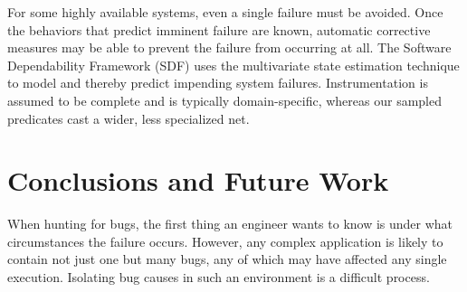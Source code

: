 \documentclass{sig-alternate}
\newcommand{\comment}[1]{}
\begin{document}
\comment{More recent work of interest:

  \begin{itemize}
  \item S.\ Elbaum, S.\ Kanduri and A.\ Andrews, ``Anomalies as
    Precursors of Field Failures, International Symposium of Software
    Reliability Engineering'', IEEE, November 2003.

  \item S.\ Elbaum and M.\ Hardojo, ``An Empirical Study on Profiling
    Strategies for Released Software and Their Application to QA
    Activities'', Technical Report TR03-09-01, University of Nebraska
    - Lincoln, September 2003.
  \end{itemize}

  Cannot find either online, but have written to Elbaum asking him for
  copies.}

For some highly available systems, even a single failure must be
avoided.  Once the behaviors that predict imminent failure are known,
automatic corrective measures may be able to prevent the failure from
occurring at all.  The Software Dependability Framework (SDF)
\cite{Gross:2003:PSMUST} uses the multivariate state estimation
technique to model and thereby predict impending system failures.
Instrumentation is assumed to be complete and is typically
domain-specific, whereas our sampled predicates cast a wider, less
specialized net.  \comment{We understand through informal
  communication that the SDF is able to anticipate when a player is
  about to lose an instrumented game of Tetris, and can intervene by
  removing rows to allow the game to continue.  But maybe I shouldn't
  say that, as it kind of makes their system sound like a joke.}

\comment{Cannot find any more recent work by these people in this
  area.  Where did they all go?  Porter has plenty of other recent
  work, but apparently nothing related.  Gross and McMaster have zero
  publication information on their home pages, while Umranov and Votta
  seem to have vanished entirely.  Have written to Gross and Porter
  asking if they have anything more recent I should look at.}

\section{Conclusions and Future Work}
\label{sec:conclusions}

When hunting for bugs, the first thing an engineer wants to know is
under what circumstances the failure occurs.  However, any complex
application is likely to contain not just one but many bugs, any of
which may have affected any single execution.  Isolating bug causes in
such an environment is a difficult process.
\end{document}
